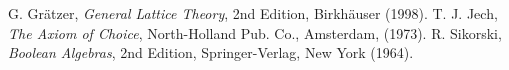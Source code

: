 \documentclass[12pt]{article}
\begin{document}
\begin{thebibliography}{9}
 G. Gr\"{a}tzer, {\em General Lattice Theory}, 2nd Edition, Birkh\"{a}user (1998).
 T. J. Jech, \emph{The Axiom of Choice}, North-Holland Pub. Co., Amsterdam, (1973).
 R. Sikorski, {\em Boolean Algebras}, 2nd Edition, Springer-Verlag, New York (1964).
\end{thebibliography}


\end{document}
